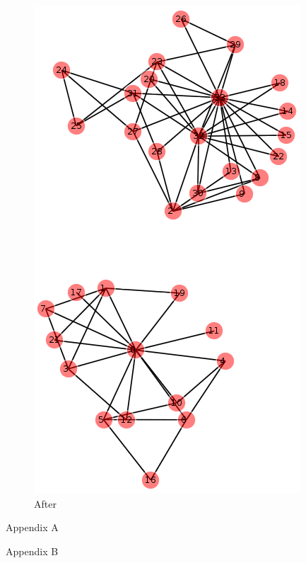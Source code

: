 \documentclass{article}
\begin{document}
\begin{figure}[H]
  \centering
  \caption{After}
  \includegraphics[scale=.5]{after.png}
\end{figure}
\clearpage

\appendix
\newpage
Appendix A


\newpage
Appendix B

\end{document}
